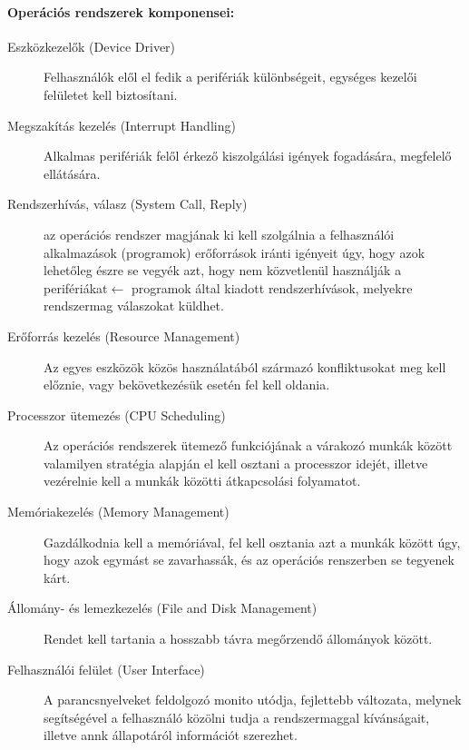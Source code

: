 \paragraph{Operációs rendszerek komponensei:}
\begin{description}
	\item[Eszközkezelők (Device Driver)] Felhasználók elől el fedik a perifériák különbségeit, egységes kezelői felületet kell biztosítani.
	\item[Megszakítás kezelés (Interrupt Handling)] Alkalmas perifériák felől érkező kiszolgálási igények fogadására, megfelelő ellátására.
	\item[Rendszerhívás, válasz (System Call, Reply)] az operációs rendszer magjának ki kell szolgálnia a felhasználói alkalmazások (programok) erőforrások iránti igényeit úgy, hogy azok lehetőleg észre se vegyék azt, hogy nem közvetlenül használják a perifériákat$\leftarrow$ programok által kiadott rendszerhívások, melyekre rendszermag válaszokat küldhet.
	\item[Erőforrás kezelés (Resource Management)] Az egyes eszközök közös használatából származó konfliktusokat meg kell előznie, vagy bekövetkezésük esetén fel kell oldania.
	\item[Processzor ütemezés (CPU Scheduling)] Az operációs rendszerek ütemező funkciójának a várakozó munkák között valamilyen stratégia alapján el kell osztani a processzor idejét, illetve vezérelnie kell a munkák közötti átkapcsolási folyamatot.
	\item[Memóriakezelés (Memory Management)] Gazdálkodnia kell a memóriával, fel kell osztania azt a munkák között úgy, hogy azok egymást se zavarhassák, és az operációs renszerben se tegyenek kárt.
	\item[Állomány- és lemezkezelés (File and Disk Management)] Rendet kell tartania a hosszabb távra megőrzendő állományok között.
	\item[Felhasználói felület (User Interface)] A parancsnyelveket feldolgozó monito utódja, 	fejlettebb változata, melynek segítségével a felhasználó közölni tudja a rendszermaggal kívánságait, illetve annk állapotáról információt szerezhet.
\end{description}

